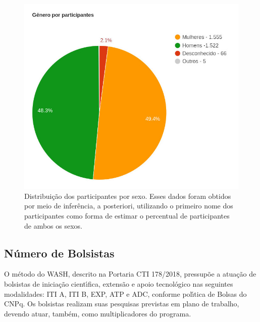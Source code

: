 \documentclass[
12pt,		%
openright,	%
twoside,  %
a4paper,			%
chapter=TITLE,		%
english,			%
french,				%
spanish,			%
brazil				%
]{USPSC-classe/USPSC}
\begin{document}
\captionsetup{format=plain}
\begin{figure}[max size={\textwidth}{\textheight}]

\centering


\begin{minipage}[b]{0.4\linewidth}
        \centering
                \includegraphics[width=1.0\linewidth]{../../imagens/genero-todos-crop.jpeg}
                \caption{Distribui\c{c}\~ao dos participantes por sexo. Esses dados foram obtidos por meio de infer\^encia, a posteriori, utilizando o primeiro nome dos participantes como forma de estimar o percentual de participantes de ambos os sexos.}
                \label{ef11d820efb73d78fb64eb6bdd03853471a8e89f}
\end{minipage}%
\hspace{0.5cm}
\end{figure}



\subsection[N\'umero de Bolsistas]{N\'umero de Bolsistas}\label{N\'umero de Bolsistas}
O m\'etodo do WASH, descrito na Portaria CTI 178/2018, pressup\~oe a atua\c{c}\~ao de bolsistas de inicia\c{c}\~ao cient\'{\i}fica, extens\~ao e apoio tecnol\'ogico nas seguintes modalidades: ITI A, ITI B, EXP, ATP e ADC, conforme pol\'{\i}tica de Bolsas do CNPq. Os bolsistas realizam suas pesquisas previstas em plano de trabalho, devendo atuar, tamb\'em, como multiplicadores do programa.
\end{document}
